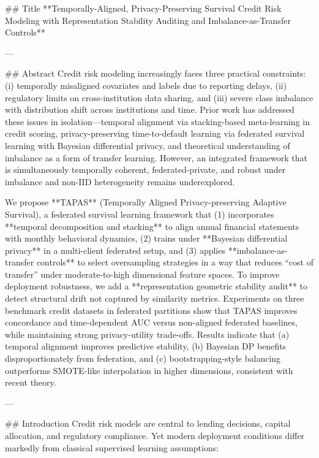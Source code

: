 ## Title  
**Temporally-Aligned, Privacy-Preserving Survival Credit Risk Modeling with Representation Stability Auditing and Imbalance-as-Transfer Controls**

---

## Abstract  
Credit risk modeling increasingly faces three practical constraints: (i) temporally misaligned covariates and labels due to reporting delays, (ii) regulatory limits on cross-institution data sharing, and (iii) severe class imbalance with distribution shift across institutions and time. Prior work has addressed these issues in isolation—temporal alignment via stacking-based meta-learning in credit scoring, privacy-preserving time-to-default learning via federated survival learning with Bayesian differential privacy, and theoretical understanding of imbalance as a form of transfer learning. However, an integrated framework that is simultaneously temporally coherent, federated-private, and robust under imbalance and non-IID heterogeneity remains underexplored.  

We propose **TAPAS** (Temporally Aligned Privacy-preserving Adaptive Survival), a federated survival learning framework that (1) incorporates **temporal decomposition and stacking** to align annual financial statements with monthly behavioral dynamics, (2) trains under **Bayesian differential privacy** in a multi-client federated setup, and (3) applies **imbalance-as-transfer controls** to select oversampling strategies in a way that reduces “cost of transfer” under moderate-to-high dimensional feature spaces. To improve deployment robustness, we add a **representation geometric stability audit** to detect structural drift not captured by similarity metrics. Experiments on three benchmark credit datasets in federated partitions show that TAPAS improves concordance and time-dependent AUC versus non-aligned federated baselines, while maintaining strong privacy-utility trade-offs. Results indicate that (a) temporal alignment improves predictive stability, (b) Bayesian DP benefits disproportionately from federation, and (c) bootstrapping-style balancing outperforms SMOTE-like interpolation in higher dimensions, consistent with recent theory.

---

## Introduction  
Credit risk models are central to lending decisions, capital allocation, and regulatory compliance. Yet modern deployment conditions differ markedly from classical supervised learning assumptions:

